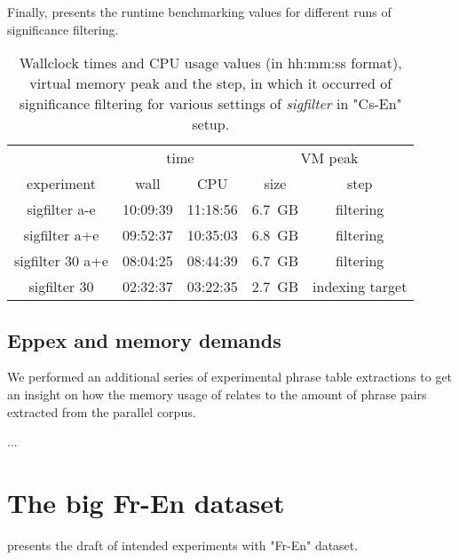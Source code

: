 Finally,  presents the runtime benchmarking
values for different runs of significance filtering.

\begin{table}[ht]
\centering
\begin{tabular}{ | c | c c | c c | }
\hline
 & \multicolumn{2}{|c|}{time} & \multicolumn{2}{|c|}{VM peak} \\
experiment & wall & CPU & size & step \\
\hline
\hline
sigfilter a-e     & 10:09:39 & 11:18:56 & 6.7~GB & filtering \\
sigfilter a+e     & 09:52:37 & 10:35:03 & 6.8~GB & filtering \\
sigfilter 30 a+e  & 08:04:25 & 08:44:39 & 6.7~GB & filtering \\
sigfilter 30      & 02:32:37 & 03:22:35 & 2.7~GB & indexing target \\
\hline
\end{tabular}
\caption{\label{cs-en-wmt13-sigfilter-runtime-benchmarks}
Wallclock times and CPU usage values (in hh:mm:ss format), virtual memory peak and the step, in which
it occurred of significance filtering for various settings of \emph{sigfilter} in "Cs-En" setup.}
\end{table}

\subsection{Eppex and memory demands}


We performed an additional series of experimental phrase table extractions
to get an insight on how the memory usage of \eppex{} relates to the amount of
phrase pairs extracted from the parallel corpus.

...

\section{The big Fr-En dataset}
\label{sec:fr-en-results}

 presents the draft of intended experiments with "Fr-En" dataset.

